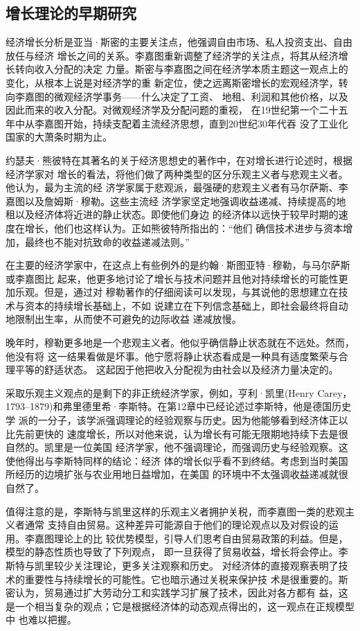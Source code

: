 \subsection{增长理论的早期研究}

经济增长分析是亚当·斯密的主要关注点，他强调自由市场、私人投资支出、自由放任与经济
增长之间的关系。李嘉图重新调整了经济学的关注点，将其从经济增长转向收入分配的决定
力量。斯密与李嘉图之间在经济学本质主题这一观点上的变化，从根本上说是对经济学的重
新定位，使之远离斯密增长的宏观经济学，转向李嘉图的微观经济学事务——什么决定了工资、
地租、利润和其他价格，以及因此而来的收入分配。对微观经济学及分配问题的重视，
在19世纪第一个二十五年中从李嘉图开始，持续支配着主流经济思想，直到20世纪30年代吞
没了工业化国家的大萧条时期为止。

约瑟夫·熊彼特在其著名的关于经济思想史的著作中，在对增长进行论述时，根据经济学家对
增长的看法，将他们做了两种类型的区分乐观主义者与悲观主义者。他认为，最为主流的经
济学家属于悲观派，最强硬的悲观主义者有马尔萨斯、李嘉图以及詹姆斯·穆勒。这些主流经
济学家坚定地强调收益递减、持续提高的地租以及经济体将近进的静止状态。即使他们身边
的经济体以远快于较早时期的速度在增长，他们也这样认为。正如熊彼特所指出的：“他们
确信技术进步与资本增加，最终也不能对抗致命的收益递减法则。”

在主要的经济学家中，在这点上有些例外的是约翰·斯图亚特·穆勒，与马尔萨斯或李嘉图比
起来，他更多地讨论了增长与技术问题并且他对持续增长的可能性更加乐观。但是，通过对
穆勒著作的仔细阅读可以发现，与其说他的思想建立在技术与资本的持续增长基础上，不如
说建立在下列信念基础上，即社会最终将自动地限制出生率，从而使不可避免的边际收益
递减放慢。

晚年时，穆勒更多地是一个悲观主义者。他似乎确信静止状态就在不远处。然而，他没有将
这一结果看做是坏事。他宁愿将静止状态看成是一种具有适度繁荣与合理平等的舒适状态。
这起因于他把收入分配视为由社会以及经济力量决定的。

采取乐观主义观点的是剩下的非正统经济学家，例如，亨利·凯里(Henry
Carey，1793--1879)和弗里德里希·李斯特。在第12章中已经论述过李斯特，他是德国历史学
派的一分子，该学派强调理论的经验观察与历史。因为他能够看到经济体正以比先前更快的
速度增长，所以对他来说，认为增长有可能无限期地持续下去是很自然的。凯里是一位美国
经济学家，他不强调理论，而强调历史与经验观察。这使他得出与李斯特同样的结论：经济
体的增长似乎看不到终结。考虑到当时美国所经历的边境扩张与农业用地日益增加，在美国
的环境中不太强调收益递减就很自然了。

值得注意的是，李斯特与凯里这样的乐观主义者拥护关税，而李嘉图一类的悲观主义者通常
支持自由贸易。这种差异可能源自于他们的理论观点以及对假设的运用。李嘉图理论上的比
较优势模型，引导人们思考自由贸易政策的利益。但是，模型的静态性质也导致了下列观点，
即一旦获得了贸易收益，增长将会停止。李斯特与凯里较少关注理论，更多关注观察和历史。
对经济体的直接观察表明了技术的重要性与持续增长的可能性。它也暗示通过关税来保护技
术是很重要的。斯密认为，贸易通过扩大劳动分工和实践学习扩展了技术，因此对各方都有
益，这是一个相当复杂的观点；它是根据经济体的动态观点得出的，这一观点在正规模型中
也难以把握。

